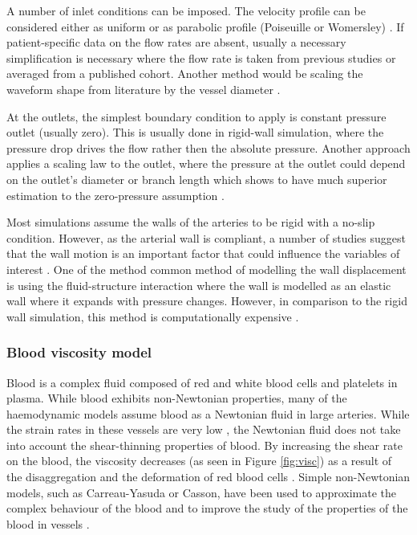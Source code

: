 A number of inlet conditions can be imposed. The velocity profile can be considered either as uniform or as parabolic profile (Poiseuille or Womersley) \cite{Steinman2019HowVariability, Alimohammadi2015AorticUnderstanding}. If patient-specific data on the flow rates are absent, usually a necessary simplification is necessary where the flow rate is taken from previous studies or averaged from a published cohort. Another method would be scaling the waveform shape from literature by the vessel diameter \cite{Morris2016ComputationalMedicine}. \par

At the outlets, the simplest boundary condition to apply is constant pressure outlet (usually zero). This is usually done in rigid-wall simulation, where the pressure drop drives the flow rather then the absolute pressure. Another approach applies a scaling law to the outlet, where the pressure at the outlet could depend on the outlet's diameter or branch length which shows to have much superior estimation to the zero-pressure assumption \cite{Pirola2017OnDynamics, Les2010QuantificationDynamics}. \par

Most simulations assume the walls of the arteries to be rigid with a no-slip condition. However, as the arterial wall is compliant,  a number of studies suggest that the wall motion is an important factor that could influence the variables of interest \cite{Alimohammadi2017, Bonfanti2018AInteraction}. One of the method common method of modelling the wall displacement is using the fluid-structure interaction where the wall is modelled as an elastic wall where it expands with pressure changes. However, in comparison to the rigid wall simulation, this method is computationally expensive \cite{Steinman2012AssumptionsHemodynamics}.

\subsubsection{Blood viscosity model}
Blood is a complex fluid composed of red and white blood cells and platelets in plasma. While blood exhibits non-Newtonian properties, many of the haemodynamic models assume blood as a Newtonian fluid in large arteries. While the strain rates in these vessels are very low \cite{Fung1997BiomechanicsCirculation}, the Newtonian fluid does not take into account the shear-thinning properties of blood. By increasing the shear rate on the blood, the viscosity decreases (as seen in Figure \ref{fig:visc}) as a result of the disaggregation and the deformation of red blood cells \cite{Gijsen1999TheModel,Cho1991EffectsFlows}. Simple non-Newtonian models, such as Carreau-Yasuda or Casson, have been used to approximate the complex behaviour of the blood and to improve the study of the properties of the blood in vessels  \cite{Alimohammadi2015PredictingApproach}. \par

